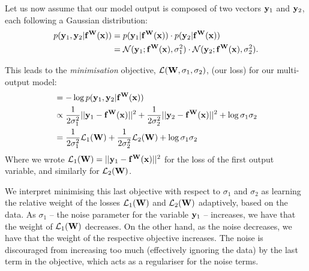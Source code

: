 Let us now assume that our model output is composed of two vectors $\mathbf{y}_1$ and $\mathbf{y}_2$, each following a Gaussian distribution:
\begin{equation}
\begin{split}
p(\mathbf{y}_1, \mathbf{y}_2 | \mathbf{f}^{\mathbf{W}}(\mathbf{x})) &= 
p(\mathbf{y}_1 | \mathbf{f}^{\mathbf{W}}(\mathbf{x})) \cdot p(\mathbf{y}_2 | \mathbf{f}^{\mathbf{W}}(\mathbf{x})) \\
&= 
\mathcal{N}(\mathbf{y}_1; \mathbf{f}^{\mathbf{W}}(\mathbf{x}), \sigma_1^2) \cdot
\mathcal{N}(\mathbf{y}_2; \mathbf{f}^{\mathbf{W}}(\mathbf{x}), \sigma_2^2).
\end{split}
\end{equation}

This leads to the \textit{minimisation} objective, $\mathcal{L}(\mathbf{W}, \sigma_1, \sigma_2)$, (our loss) for our multi-output model:
\begin{equation}
\begin{split}
 &= 
- \log p(\mathbf{y}_1, \mathbf{y}_2 | \mathbf{f}^{\mathbf{W}}(\mathbf{x})) \\
&\propto
\frac{1}{2 \sigma_1^2} ||\mathbf{y}_1 - \mathbf{f}^{\mathbf{W}}(\mathbf{x})||^2
+ \frac{1}{2 \sigma_2^2} ||\mathbf{y}_2 - \mathbf{f}^{\mathbf{W}}(\mathbf{x})||^2 
+ \log \sigma_1 \sigma_2 \\
&= \frac{1}{2 \sigma_1^2} \mathcal{L}_1(\mathbf{W}) 
+ \frac{1}{2 \sigma_2^2} \mathcal{L}_2(\mathbf{W})
+ \log \sigma_1 \sigma_2
\end{split}
\end{equation}
Where we wrote $\mathcal{L}_1(\mathbf{W}) = ||\mathbf{y}_1 - \mathbf{f}^{\mathbf{W}}(\mathbf{x})||^2$ for the loss of the first output variable, and similarly for $\mathcal{L}_2(\mathbf{W})$.


We interpret minimising this last objective with respect to $\sigma_1$ and $\sigma_2$ as learning the relative weight of the losses $\mathcal{L}_1(\mathbf{W})$ and $\mathcal{L}_2(\mathbf{W})$ adaptively, based on the data. As $\sigma_1$ -- the noise parameter for the variable $\mathbf{y}_1$ -- increases, we have that the weight of $\mathcal{L}_1(\mathbf{W})$ decreases. On the other hand, as the noise decreases, we have that the weight of the respective objective increases. The noise is discouraged from increasing too much (effectively ignoring the data) by the last term in the objective, which acts as a regulariser for the noise terms.

